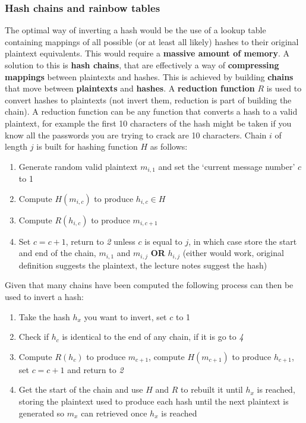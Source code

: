 \documentclass{article}
\begin{document}
\subsubsection{Hash chains and rainbow tables}
The optimal way of inverting a hash would be the use of a lookup table containing mappings of all possible (or at least all likely) hashes to their original plaintext equivalents. This would require a \textbf{massive amount of memory}. A solution to this is \textbf{hash chains}, that are effectively a way of \textbf{compressing mappings} between plaintexts and hashes. This is achieved by building \textbf{chains} that move between \textbf{plaintexts} and \textbf{hashes}. A \textbf{reduction function} $ R $ is used to convert hashes to plaintexts (not invert them, reduction is part of building the chain). A reduction function can be any function that converts a hash to a valid plaintext, for example the first 10 characters of the hash might be taken if you know all the passwords you are trying to crack are 10 characters.
Chain $ i $ of length $ j $ is built for hashing function $ H $ as follows:
\begin{enumerate}
	\item Generate random valid plaintext $ m_{i,1} $ and set the `current message number' $ c $ to 1
	\item Compute $ H(m_{i,c}) $ to produce $ h_{i,c} \in H $
	\item Compute $ R(h_{i,c}) $ to produce $ m_{i,c+1} $
	\item Set $ c = c + 1 $, return to \textit{2} unless $ c $ is equal to $ j $, in which case store the start and end of the chain, $ m_{i,1} $ and $ m_{i,j} $ \textbf{OR} $ h_{i,j} $ (either would work, original definition suggests the plaintext, the lecture notes suggest the hash)
\end{enumerate}
Given that many chains have been computed the following process can then be used to invert a hash:
\begin{enumerate}
	\item Take the hash $ h_{x} $ you want to invert, set $ c $ to 1
	\item Check if $ h_{c} $ is identical to the end of any chain, if it is go to \textit{4}
	\item Compute $ R(h_{c}) $ to produce $ m_{c+1} $, compute $ H(m_{c+1}) $ to produce $ h_{c+1} $, set $ c = c + 1 $ and return to \textit{2}
	\item Get the start of the chain and use $ H $ and $ R $ to rebuilt it until $ h_{x} $ is reached, storing the plaintext used to produce each hash until the next plaintext is generated so $ m_{x} $ can retrieved once $ h_{x} $ is reached
\end{enumerate}
\end{document}
